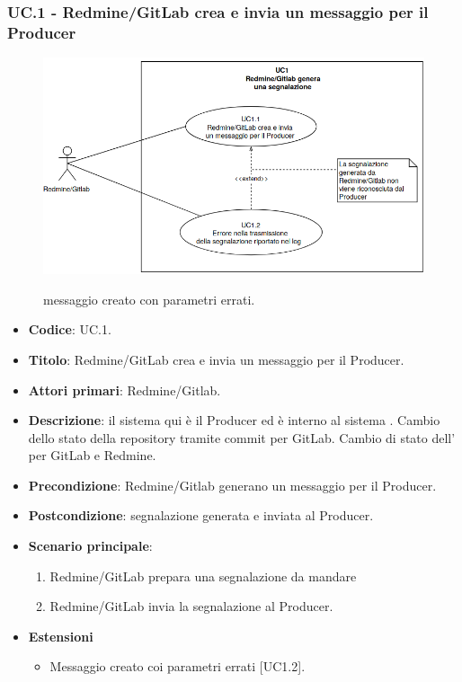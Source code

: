 \subsubsection{UC\theuccount.1 - Redmine/GitLab crea e invia un messaggio per il Producer}
    \begin{figure}[H]
		\centering
		\includegraphics[width=1\textwidth]{img/UC1_1.png}\\
		\caption{messaggio creato con parametri errati.}
	\end{figure}
	\begin{itemize}
		\item \textbf{Codice}: UC\theuccount.1.
		\item \textbf{Titolo}: Redmine/GitLab crea e invia un messaggio per il Producer.
		\item \textbf{Attori primari}: Redmine/Gitlab.
		\item \textbf{Descrizione}:
		il sistema qui è il Producer ed è interno al sistema \progetto. Cambio dello stato della repository tramite commit per GitLab. Cambio di stato dell' per GitLab e Redmine.
		\item \textbf{Precondizione}: Redmine/Gitlab generano un messaggio per il Producer.
		\item \textbf{Postcondizione}: segnalazione generata e inviata al Producer.
		\item \textbf{Scenario principale}: 
		\begin{enumerate}
			\item Redmine/GitLab prepara una segnalazione da mandare
			\item Redmine/GitLab invia la segnalazione al Producer.
		\end{enumerate}
		\item \textbf{Estensioni}
		\begin{itemize}
			\item Messaggio creato coi parametri errati [UC1.2].
		\end{itemize} 
	\end{itemize}


